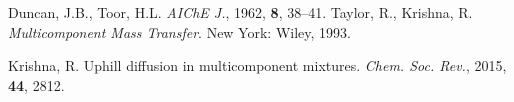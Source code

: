 \documentclass[11]{Report}
\begin{document}
\renewcommand{\bibname}{References}
\begin{thebibliography}{5}
\label{eqn:my_ref_2}
Duncan, J.B., Toor, H.L. \textit{AIChE J.}, 1962, \textbf{8}, 38–41.
\label{eqn:my_ref_1}
Taylor, R., Krishna, R. \textit{Multicomponent Mass Transfer}. New York: Wiley, 1993.

\label{eqn:my_ref_3}
Krishna, R. Uphill diffusion in multicomponent mixtures. \textit{Chem. Soc. Rev.}, 2015, \textbf{44}, 2812.

\end{thebibliography}
\end{document}
